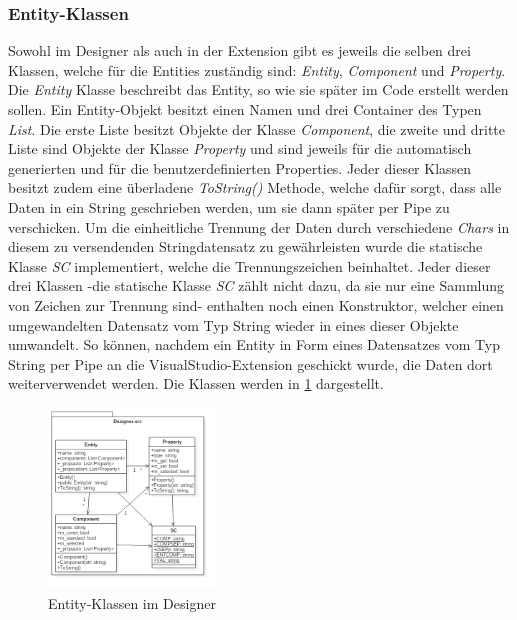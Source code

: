 \subsubsection{Entity-Klassen}
\label{entityklassen}
Sowohl im Designer als auch in der Extension gibt es jeweils die selben drei Klassen, welche für die Entities zuständig sind: \textit{Entity}, \textit{Component} und \textit{Property}.
Die \textit{Entity} Klasse beschreibt das Entity, so wie sie später im Code erstellt werden sollen. Ein Entity-Objekt besitzt einen Namen und drei Container des Typen \textit{List}. Die erste Liste besitzt Objekte der Klasse \textit{Component}, die zweite und dritte Liste sind Objekte der Klasse \textit{Property} und sind jeweils für die automatisch generierten und für die benutzerdefinierten Properties.
Jeder dieser Klassen besitzt zudem eine überladene \textit{ToString()} Methode, welche dafür sorgt, dass alle Daten in ein String geschrieben werden, um sie dann später per Pipe zu verschicken.
Um die einheitliche Trennung der Daten durch verschiedene \textit{Chars} in diesem zu versendenden Stringdatensatz zu gewährleisten wurde die statische Klasse \textit{SC} implementiert, welche die Trennungszeichen beinhaltet.
Jeder dieser drei Klassen -die statische Klasse \textit{SC} zählt nicht dazu, da sie nur eine Sammlung von Zeichen zur Trennung sind- enthalten noch einen Konstruktor, welcher einen umgewandelten Datensatz vom Typ String wieder in eines dieser Objekte umwandelt. 
So können, nachdem ein Entity in Form eines Datensatzes vom Typ String per Pipe an die VisualStudio-Extension geschickt wurde, die Daten dort weiterverwendet werden. 
Die Klassen werden in \cref{entityklassendiag} dargestellt.
\begin{figure}
	\begin{center}
		\includegraphics[width=0.4\textwidth]{03unserprogramm/Designer/EntityKlassen.png}
		\caption{Entity-Klassen im Designer}\label{entityklassendiag}
	\end{center}
\end{figure}

